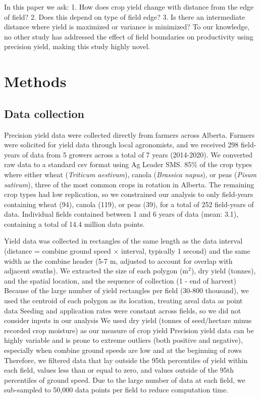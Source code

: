 \documentclass[]{elsarticle} %
\begin{document}
In this paper we ask:
1. How does crop yield change with distance from the edge of field?
2. Does this depend on type of field edge?
3. Is there an intermediate distance where yield is maximized or variance is minimized?
To our knowledge, no other study has addressed the effect of field boundaries on productivity using precision yield, making this study highly novel.

\hypertarget{methods}{%
\section{Methods}\label{methods}}

\hypertarget{data-collection}{%
\subsection{Data collection}\label{data-collection}}

Precision yield data were collected directly from farmers across Alberta.
Farmers were solicited for yield data through local agronomists, and we received 298 field-years of data from 5 growers across a total of 7 years (2014-2020).
We converted raw data to a standard csv format using Ag Leader SMS.
85\% of the crop types where either wheat (\emph{Triticum aestivum}), canola (\emph{Brassica napus}), or peas (\emph{Pisum sativum}), three of the most common crops in rotation in Alberta.
The remaining crop types had low replication, so we constrained our analysis to only field-years containing wheat (94), canola (119), or peas (39), for a total of 252 field-years of data.
Individual fields contained between 1 and 6 years of data (mean: 3.1), containing a total of 14.4 million data points.

Yield data was collected in rectangles of the same length as the data interval (distance = combine ground speed \(\times\) interval, typically 1 second) and the same width as the combine header (5-7 m, adjusted to account for overlap with adjacent swaths).
We extracted the size of each polygon (m\(^2\)), dry yield (tonnes), and the spatial location, and the sequence of collection (1 - end of harvest)
Because of the large number of yield rectangles per field (30-800 thousand), we used the centroid of each polygon as its location, treating areal data as point data
Seeding and application rates were constant across fields, so we did not consider inputs in our analysis
We used dry yield (tonnes of seed/hectare minus recorded crop moisture) as our measure of crop yield
Precision yield data can be highly variable and is prone to extreme outliers (both positive and negative), especially when combine ground speeds are low and at the beginning of rows
Therefore, we filtered data that lay outside the 95th percentiles of yield within each field, values less than or equal to zero, and values outside of the 95th percentiles of ground speed.
Due to the large number of data at each field, we sub-sampled to 50,000 data points per field to reduce computation time.
\end{document}
